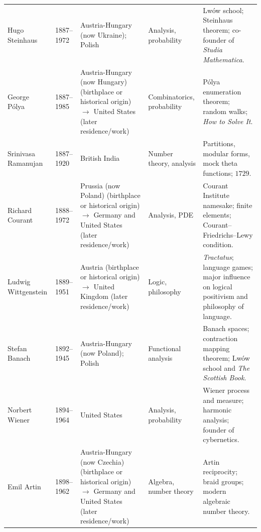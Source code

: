 {\begin{longtable}{@{}L{0.145\textwidth}L{0.09\textwidth}L{0.225\textwidth}L{0.14\textwidth}L{0.30\textwidth}@{}}
        Hugo Steinhaus
        & 1887--1972
        & Austria-Hungary (now Ukraine); Polish
        & Analysis, probability
        & Lwów school; Steinhaus theorem; co-founder of \textit{Studia
          Mathematica}. \\

        George Pólya
        & 1887--1985
        & Austria-Hungary (now Hungary) (birthplace or historical origin) \(\to\) United States (later residence/work)
        & Combinatorics, probability
        & Pólya enumeration theorem; random walks; \textit{How to Solve It}. \\

        Srinivasa Ramanujan
        & 1887--1920
        & British India
        & Number theory, analysis
        & Partitions, modular forms, mock theta functions; $1729$. \\

        Richard Courant
        & 1888--1972
        & Prussia (now Poland) (birthplace or historical origin) \(\to\) Germany and United States (later residence/work)
        & Analysis, PDE
        & Courant Institute namesake; finite elements; Courant--Friedrichs--Lewy
          condition. \\

        Ludwig Wittgenstein
        & 1889--1951
        & Austria (birthplace or historical origin) \(\to\) United Kingdom (later residence/work)
        & Logic, philosophy
        & \textit{Tractatus}; language games; major influence on logical
          positivism and philosophy of language. \\

        Stefan Banach
        & 1892--1945
        & Austria-Hungary (now Poland); Polish
        & Functional analysis
        & Banach spaces; contraction mapping theorem; Lwów school and
          \textit{The Scottish Book}. \\

        Norbert Wiener
        & 1894--1964
        & United States
        & Analysis, probability
        & Wiener process and measure; harmonic analysis; founder of
          cybernetics. \\

        Emil Artin
        & 1898--1962
        & Austria-Hungary (now Czechia) (birthplace or historical origin) \(\to\) Germany and United States (later residence/work)
        & Algebra, number theory
        & Artin reciprocity; braid groups; modern algebraic number theory. \\


\end{longtable}}
